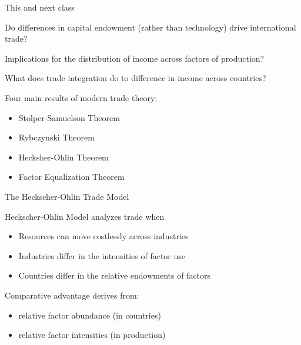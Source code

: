 \documentclass[notes,11pt, aspectratio=169, xcolor=table]{beamer}
\newenvironment{wideitemize}{\itemize\addtolength{\itemsep}{10pt}}{\enditemize}
\begin{document}
\begin{frame}{This and next class}
\begin{wideitemize}
    \item Do differences in capital endowment (rather than technology) drive international trade?
    \item<2-> Implications for the distribution of income across factors of production?
    \item<3-> What does trade integration do to difference in income across countries?
    \item<4-> Four main results of modern trade theory:
    \begin{itemize}
        \item Stolper-Samuelson Theorem
        \item Rybczynski Theorem
        \item Hecksher-Ohlin Theorem
        \item Factor Equalization Theorem
    \end{itemize}
\end{wideitemize}
\end{frame}


\begin{frame}{The Heckscher-Ohlin Trade Model}
    \begin{wideitemize}
        \item Heckscher-Ohlin Model analyzes trade when
        \begin{itemize}
            \item Resources can move costlessly across industries
            \item<2-> Industries differ in the intensities of factor use
            \item<3-> Countries differ in the relative endowments of factors
        \end{itemize}
    \item<4->  Comparative advantage derives from:
    \begin{itemize}
        \item relative factor abundance (in countries)
        \item relative factor intensities (in production)
    \end{itemize} 
    \end{wideitemize}    
\end{frame}
\end{document}
